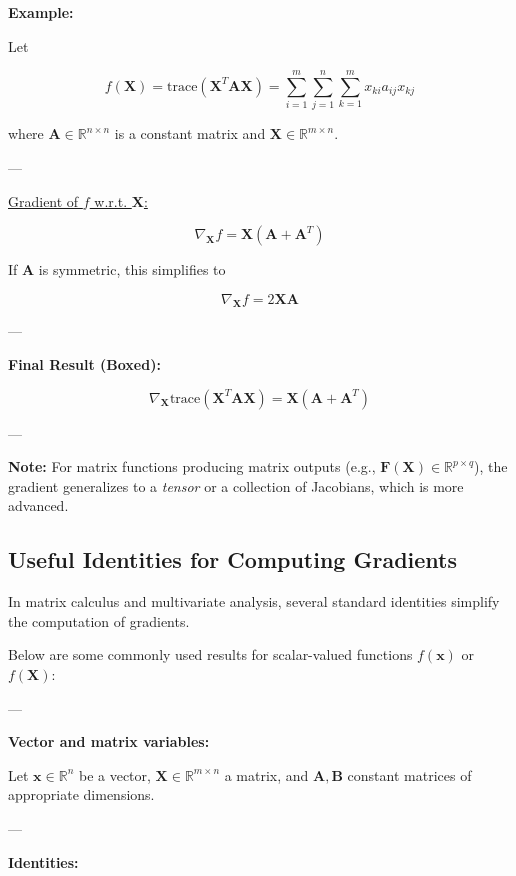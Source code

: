 \textbf{Example:}

Let

\[
f(\mathbf{X}) = \mathrm{trace}(\mathbf{X}^T \mathbf{A} \mathbf{X}) = \sum_{i=1}^m \sum_{j=1}^n \sum_{k=1}^m x_{ki} a_{ij} x_{kj}
\]

where \( \mathbf{A} \in \mathbb{R}^{n \times n} \) is a constant matrix and \( \mathbf{X} \in \mathbb{R}^{m \times n} \).

---

\underline{Gradient of \( f \) w.r.t. \( \mathbf{X} \):}

\[
\nabla_{\mathbf{X}} f = \mathbf{X} (\mathbf{A} + \mathbf{A}^T)
\]

If \( \mathbf{A} \) is symmetric, this simplifies to

\[
\nabla_{\mathbf{X}} f = 2 \mathbf{X} \mathbf{A}
\]

---

\textbf{Final Result (Boxed):}

\[
\boxed{
\nabla_{\mathbf{X}} \mathrm{trace}(\mathbf{X}^T \mathbf{A} \mathbf{X}) = \mathbf{X} (\mathbf{A} + \mathbf{A}^T)
}
\]

---

\textbf{Note:} For matrix functions producing matrix outputs (e.g., \( \mathbf{F}(\mathbf{X}) \in \mathbb{R}^{p \times q} \)), the gradient generalizes to a \textit{tensor} or a collection of Jacobians, which is more advanced.


\subsection{Useful Identities for Computing Gradients}

In matrix calculus and multivariate analysis, several standard identities simplify the computation of gradients.

Below are some commonly used results for scalar-valued functions \( f(\mathbf{x}) \) or \( f(\mathbf{X}) \):

---

\textbf{Vector and matrix variables:}

Let \( \mathbf{x} \in \mathbb{R}^n \) be a vector, \( \mathbf{X} \in \mathbb{R}^{m \times n} \) a matrix, and \( \mathbf{A}, \mathbf{B} \) constant matrices of appropriate dimensions.

---

\textbf{Identities:}

